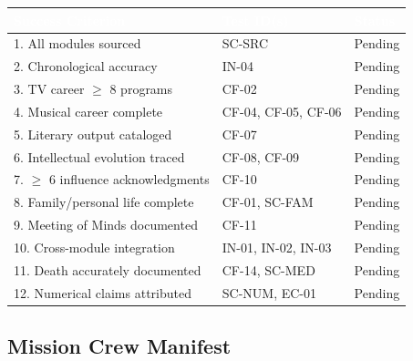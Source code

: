 \documentclass[11pt,letterpaper]{article}
\newcommand{\tableheader}[1]{\textbf{\sffamily\textcolor{white}{#1}}}
\begin{document}
\begin{center}
\begin{tabularx}{\textwidth}{XL{3cm}C{1.5cm}}
\toprule
{}
\tableheader{Success Criterion} & \tableheader{Test ID(s)} & \tableheader{Status} \\
. All modules sourced & SC-SRC & Pending \\
2. Chronological accuracy & IN-04 & Pending \\
3. TV career $\geq$ 8 programs & CF-02 & Pending \\
4. Musical career complete & CF-04, CF-05, CF-06 & Pending \\
5. Literary output cataloged & CF-07 & Pending \\
6. Intellectual evolution traced & CF-08, CF-09 & Pending \\
7. $\geq$ 6 influence acknowledgments & CF-10 & Pending \\
8. Family/personal life complete & CF-01, SC-FAM & Pending \\
9. Meeting of Minds documented & CF-11 & Pending \\
10. Cross-module integration & IN-01, IN-02, IN-03 & Pending \\
11. Death accurately documented & CF-14, SC-MED & Pending \\
12. Numerical claims attributed & SC-NUM, EC-01 & Pending \\
\bottomrule
\end{tabularx}
\end{center}

\subsection{Mission Crew Manifest}
\end{document}
